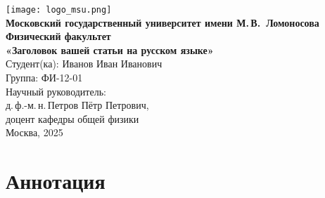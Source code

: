 \documentclass[a4paper,12pt]{article}
\begin{document}
\begin{titlepage}
  \centering
  \vspace*{1cm}
  \texttt{[image: logo\_msu.png]}\\[1cm]

  {\large \textbf{Московский государственный университет имени М.\,В.~Ломоносова}}\\[0.5cm]
  {\large \textbf{Физический факультет}}\\[2cm]

  {\LARGE \textbf{«Заголовок вашей статьи на русском языке»}}\\[2cm]

  {\large Студент(ка): Иванов Иван Иванович}\\[0.3cm]
  {\large Группа: ФИ-12-01}\\[0.3cm]
  {\large Научный руководитель: \\[0.1cm]
    д.\,ф.-м.\,н.\,Петров Пётр Петрович, \\[0.1cm]
    доцент кафедры общей физики}\\[2cm]

  {\large Москва, 2025}\\
\end{titlepage}

\section*{Аннотация}
\end{document}
